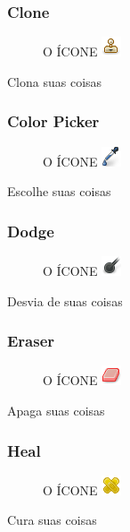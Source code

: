 \documentclass[12pt,onecolumn]{article}
\begin{document}
    \subsubsection{Clone}
      \begin{figure}[H]
        O ÍCONE
        \includegraphics{gimp-icons/stock-tool-clone-22.png}
        \label{fig:clone}
      \end{figure}
      Clona suas coisas

    \subsubsection{Color Picker}
      \begin{figure}[H]
        O ÍCONE
        \includegraphics{gimp-icons/stock-tool-color-picker-22.png}
        \label{fig:color-picker}
      \end{figure}
      Escolhe suas coisas
      
    \subsubsection{Dodge}
      \begin{figure}[H]
        O ÍCONE
        \includegraphics{gimp-icons/stock-tool-dodge-22.png}
        \label{fig:dodge}
      \end{figure}
      Desvia de suas coisas

    \subsubsection{Eraser}
      \begin{figure}[H]
        O ÍCONE
        \includegraphics{gimp-icons/stock-tool-eraser-22.png}
        \label{fig:eraser}
      \end{figure}
      Apaga suas coisas

    \subsubsection{Heal}
      \begin{figure}[H]
        O ÍCONE
        \includegraphics{gimp-icons/stock-tool-heal-22.png}
        \label{fig:heal}
      \end{figure}
      Cura suas coisas
\end{document}
